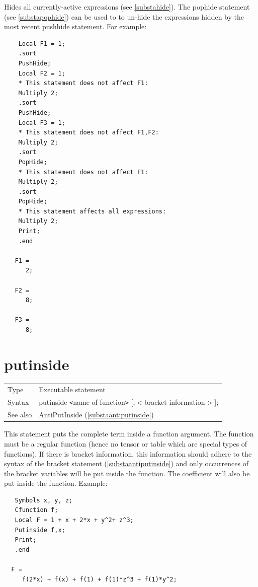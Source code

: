 \noindent Hides all currently-active 
expressions (see \ref{substahide}). The pophide statement 
(see \ref{substapophide}) can be used to to un-hide the expressions hidden
by the most recent pushhide statement. For example:
\begin{verbatim}
    Local F1 = 1;
    .sort
    PushHide;
    Local F2 = 1;
    * This statement does not affect F1:
    Multiply 2;
    .sort
    PushHide;
    Local F3 = 1;
    * This statement does not affect F1,F2:
    Multiply 2;
    .sort
    PopHide;
    * This statement does not affect F1:
    Multiply 2;
    .sort
    PopHide;
    * This statement affects all expressions:
    Multiply 2;
    Print;
    .end

   F1 =
      2;

   F2 =
      8;

   F3 =
      8;
\end{verbatim}
\vspace{10mm}


\section{putinside}
\label{substaputinside}

\noindent \begin{tabular}{ll}
Type & Executable statement\\
Syntax & putinside {\tt<}name of function{\tt>} [,$<$bracket information$>$];
\\ See also & AntiPutInside (\ref{substaantiputinside})
\end{tabular}\vspace{4mm}

\noindent This statement puts the complete term inside a 
function argument. The function must be a regular function (hence no tensor 
or table which are special types of functions). If there is 
bracket information, this information should adhere to the 
syntax of the bracket statement (\ref{substaantiputinside}) and only 
occurrences of the bracket variables will be put inside the function. The 
coefficient will also be put inside the function. Example:
\begin{verbatim}
   Symbols x, y, z;
   Cfunction f;
   Local F = 1 + x + 2*x + y^2+ z^3;
   Putinside f,x;
   Print;
   .end

  F =
     f(2*x) + f(x) + f(1) + f(1)*z^3 + f(1)*y^2;
\end{verbatim}
\vspace{10mm}


